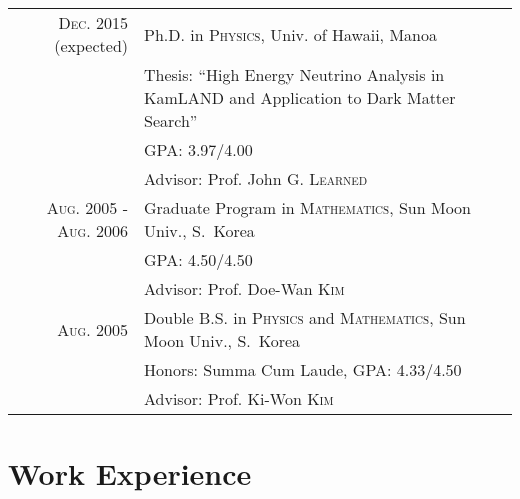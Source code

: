 \documentclass[a4paper,10pt]{article} %
\begin{document}
\begin{tabular}{rp{10.3cm}}	
	\textsc{Dec.} 2015 (expected) & Ph.D. in \textsc{Physics},
	Univ. of Hawaii, Manoa\\
	& \small Thesis: ``High Energy Neutrino Analysis in KamLAND and Application
	to Dark Matter Search''\\
	& \small GPA: 3.97/4.00\\
	& \small Advisor: Prof. John G. \textsc{Learned}\\


	\textsc{Aug.} 2005 - \textsc{Aug.} 2006 & Graduate Program in
	\textsc{Mathematics}, Sun Moon Univ., S.~Korea\\
	& \small GPA: 4.50/4.50\\
	& \small Advisor: Prof. Doe-Wan \textsc{Kim}\\


	\textsc{Aug.} 2005 & Double B.S. in \textsc{Physics} and
	\textsc{Mathematics}, Sun Moon Univ., S.~Korea\\
	& \small Honors: Summa Cum Laude, GPA: 4.33/4.50\\
	& \small Advisor: Prof. Ki-Won \textsc{Kim}\\


\end{tabular}


\section{Work Experience}
\end{document}
